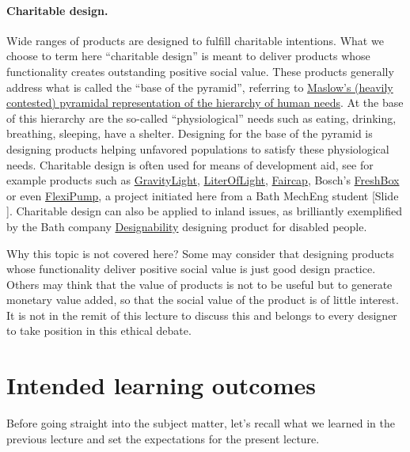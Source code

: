 \documentclass{article}
\newcounter{slide}
\begin{document}
\paragraph{Charitable design.} Wide ranges of products are designed to fulfill charitable intentions. What we choose to term here ``charitable design'' is meant to deliver products whose functionality creates outstanding positive social value. These products generally address what is called the ``base of the pyramid'', referring to \href{https://en.wikipedia.org/wiki/Maslow\%27s_hierarchy_of_needs}{Maslow's (heavily contested) pyramidal representation of the hierarchy of human needs}. At the base of this hierarchy are the so-called ``physiological'' needs such as eating, drinking, breathing, sleeping, have a shelter. Designing for the base of the pyramid is designing products helping unfavored populations to satisfy these physiological needs. Charitable design is often used for means of development aid, see for example products such as \href{https://gravitylight.org/}{GravityLight}, \href{http://literoflightswitzerland.org/}{LiterOfLight}, \href{http://faircap.org/}{Faircap}, Bosch's \href{https://www.bosch.com/stories/freshbox-refrigeration-without-electricity/}{FreshBox} or even \href{https://www.flexipump.com/}{FlexiPump}, a project initiated here from a Bath MechEng student {\color{blue}[Slide ]}. Charitable design can also be applied to inland issues, as brilliantly exemplified by the Bath company \href{https://designability.org.uk/}{Designability} designing product for disabled people. 

Why this topic is not covered here? Some may consider that designing products whose functionality deliver positive social value is just good design practice. Others may think that the value of products is not to be useful but to generate monetary value added, so that the social value of the product is of little interest. It is not in the remit of this lecture to discuss this and belongs to every designer to take position in this ethical debate.

\section{Intended learning outcomes}
\label{sec:ilos}

Before going straight into the subject matter, let's recall what we learned in the previous lecture and set the expectations for the present lecture.
\end{document}
